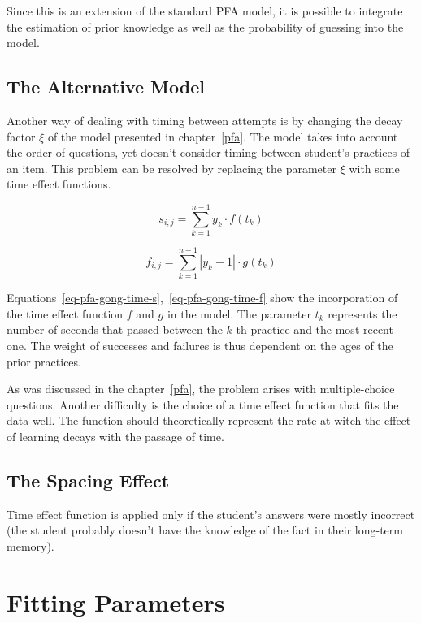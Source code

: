 Since this is an extension of the standard PFA model, it is possible to integrate the estimation of prior knowledge as well as the probability of guessing into the model.

\subsection{The Alternative Model}

Another way of dealing with timing between attempts is by changing the decay factor $\xi$ of the model presented in chapter~\ref{pfa}. The model takes into account the order of questions, yet doesn't consider timing between student's practices of an item. This problem can be resolved by replacing the parameter $\xi$ with some time effect functions.

\begin{equation} \label{eq-pfa-gong-time-s}
  s_{i,j} = \sum_{k=1}^{n-1} y_k \cdot f(t_k)
\end{equation}

\begin{equation} \label{eq-pfa-gong-time-f}
  f_{i,j} = \sum_{k=1}^{n-1} |y_k - 1| \cdot g(t_k)
\end{equation}

Equations~\ref{eq-pfa-gong-time-s},~\ref{eq-pfa-gong-time-f} show the incorporation of the time effect function $f$ and $g$ in the model. The parameter $t_k$ represents the number of seconds that passed between the $k$-th practice and the most recent one. The weight of successes and failures is thus dependent on the ages of the prior practices.

As was discussed in the chapter~\ref{pfa}, the problem arises with multiple-choice questions. Another difficulty is the choice of a time effect function that fits the data well. The function should theoretically represent the rate at witch the effect of learning decays with the passage of time.

\subsection{The Spacing Effect}


Time effect function is applied only if the student's answers were mostly incorrect (the student probably doesn't have the knowledge of the fact in their long-term memory).

\section{Fitting Parameters}

